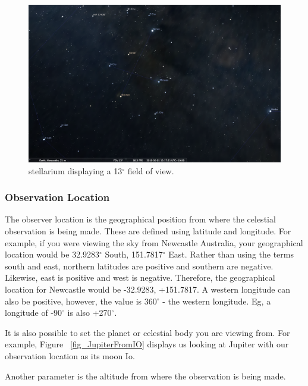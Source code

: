 \begin{figure}[htbp]
	\centering
	\includegraphics[width=1\columnwidth]{fov13}
	\caption{stellarium displaying a 13$^{\circ}$ field of view.}
	\label{fig:fov13}
\end{figure}

\subsubsection{Observation Location}
The observer location is the geographical position from where the celestial observation is being made. These are defined using latitude and longitude. For example, if you were viewing the sky from Newcastle Australia, your geographical location would be  32.9283$^{\circ}$ South, 151.7817$^{\circ}$ East. Rather than using the terms south and east, northern latitudes are positive and southern are negative. Likewise, east is positive and west is negative. Therefore, the geographical location for Newcastle would be -32.9283, +151.7817.  A western longitude can also be positive, however, the value is 360$^{\circ}$ - the western longitude. Eg, a longitude of -90$^{\circ}$ is also +270$^{\circ}$.

It is also possible to set the planet or celestial body you are viewing from. 
For example, Figure ~\ref{fig_JupiterFromIO} displays us looking at Jupiter with our observation location as its moon Io.

Another parameter is the altitude from where the observation is being made. 


